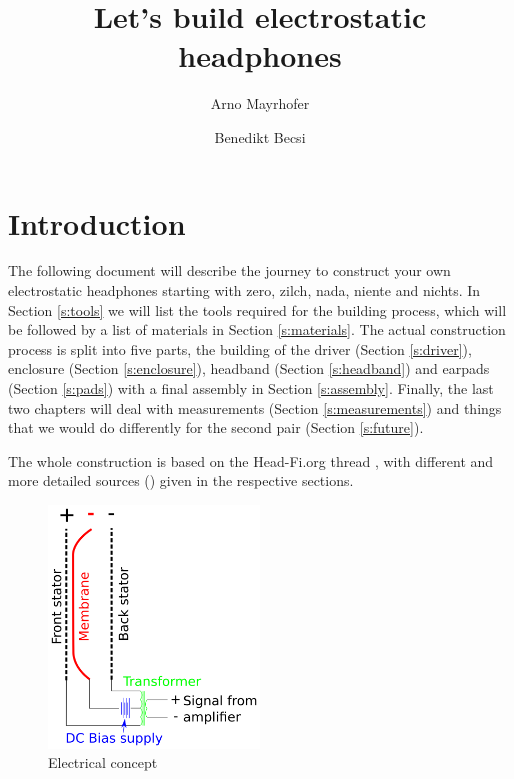 \documentclass{article}
\begin{document}
\title{Let's build electrostatic headphones}
\author{Arno Mayrhofer \and Benedikt Becsi}
\maketitle

\tableofcontents

\newpage

\section{Introduction}
\label{s:intro}
The following document will describe the journey to construct your own electrostatic headphones starting with zero, zilch, nada, niente and nichts. In Section \ref{s:tools} we will list the tools required for the building process, which will be followed by a list of materials in Section \ref{s:materials}. The actual construction process is split into five parts, the building of the driver (Section \ref{s:driver}), enclosure (Section \ref{s:enclosure}), headband (Section \ref{s:headband}) and earpads (Section \ref{s:pads}) with a final assembly in Section \ref{s:assembly}. Finally, the last two chapters will deal with measurements (Section \ref{s:measurements}) and things that we would do differently for the second pair (Section \ref{s:future}).

The whole construction is based on the Head-Fi.org thread \cite{head-fi-diy-thread}, with different and more detailed sources (\cite{electrostatic-hp-design,tcengineering-electrostatic-drivers,ww_1979}) given in the respective sections.

\begin{figure}[htb]
    \centering
    \includegraphics[width=0.5\textwidth]{images/esl_animation.png}
    \caption{Electrical concept}
    \label{f:intro:e-concept}
\end{figure}
\end{document}

